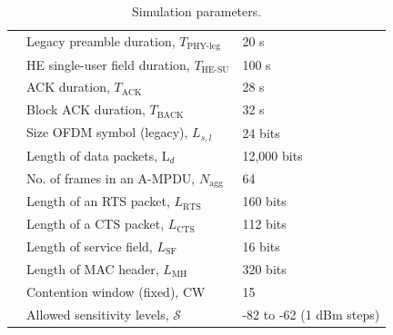 \documentclass[preprint,12pt]{elsarticle}
\theoremstyle{plain}
\begin{document}
\begin{table}[h!]
{\begin{tabular}{c|l|l|}
			\multicolumn{1}{|c|}{} & Legacy preamble duration, $T_\text{PHY-leg}$ & 20 \textmu s  \\
			\cline{2-3}
			\multicolumn{1}{|c|}{} & HE single-user field duration, $T_\text{HE-SU}$ & 100 \textmu s \\
			\cline{2-3} 
			\multicolumn{1}{|c|}{} & ACK duration, $T_\text{ACK}$ & 28 \textmu s\\
			\cline{2-3} 
			\multicolumn{1}{|c|}{} & Block ACK duration, $T_\text{BACK}$ & 32 \textmu s \\
			\cline{2-3} 
			\multicolumn{1}{|c|}{} &  Size OFDM symbol (legacy), $L_{s,l}$ & 24 bits \\
			\cline{2-3} 
			\multicolumn{1}{|c|}{} & Length of data packets, $\text{L}_{d}$ & 12,000 bits \\
			\cline{2-3} 
			\multicolumn{1}{|c|}{} & No. of frames in an A-MPDU, $N_{\text{agg}}$ & 64 \\
			\cline{2-3} 
			\multicolumn{1}{|c|}{} & Length of an RTS packet, $L_\text{RTS}$ & 160 bits \\
			\cline{2-3} 
			\multicolumn{1}{|c|}{} & Length of a CTS packet, $L_\text{CTS}$ & 112 bits \\
			\cline{2-3} 
			\multicolumn{1}{|c|}{} & Length of service field, $L_\text{SF}$ & 16 bits  \\
			\cline{2-3} 
			\multicolumn{1}{|c|}{} & Length of MAC header, $L_\text{MH}$ & 320 bits \\
			\cline{2-3} 
			\multicolumn{1}{|c|}{} & Contention window (fixed), $\text{CW}$ & 15 \\
			\cline{2-3} 
			\multicolumn{1}{|c|}{} & Allowed sensitivity levels, $\mathcal{S}$ & -82 to -62 (1 dBm steps) \\
			\hline
	\end{tabular}}
	\caption{Simulation parameters.}
	\label{table:parameters}
\end{table}
\end{document}
